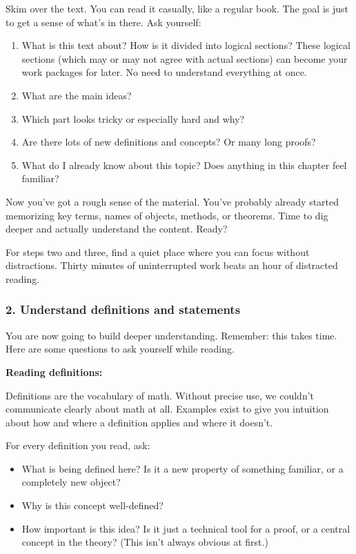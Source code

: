 \documentclass[paper=a4, fontsize=12pt]{scrartcl} %
\begin{document}
Skim over the text. You can read it casually, like a regular book. The goal is just to get a sense of what’s in there. Ask yourself:

\begin{enumerate}[label=\alph*]
\item What is this text about? How is it divided into logical sections? These logical sections (which may or may not agree with actual sections) can become your work packages for later. No need to understand everything at once.
\item What are the main ideas?
\item Which part looks tricky or especially hard and why?
\item Are there lots of new definitions and concepts? Or many long proofs?
\item What do I already know about this topic? Does anything in this chapter feel familiar?
\end{enumerate}

Now you’ve got a rough sense of the material. You’ve probably already started memorizing key terms, names of objects, methods, or theorems. Time to dig deeper and actually understand the content. Ready?

\medskip

For steps two and three, find a quiet place where you can focus without distractions. Thirty minutes of uninterrupted work beats an hour of distracted reading.

\subsubsection*{2. Understand definitions and statements}

You are now going to build deeper understanding. Remember: this takes time. Here are some questions to ask yourself while reading.

\bigskip

\noindent
\textbf{Reading definitions:}

Definitions are the vocabulary of math. Without precise use, we couldn’t communicate clearly about math at all.  
Examples exist to give you intuition about how and where a definition applies and where it doesn’t.

For every definition you read, ask:
\begin{itemize}
\item What is being defined here? Is it a new property of something familiar, or a completely new object?
\item Why is this concept well-defined?
\item How important is this idea? Is it just a technical tool for a proof, or a central concept in the theory? (This isn’t always obvious at first.)
\end{itemize}
\end{document}
